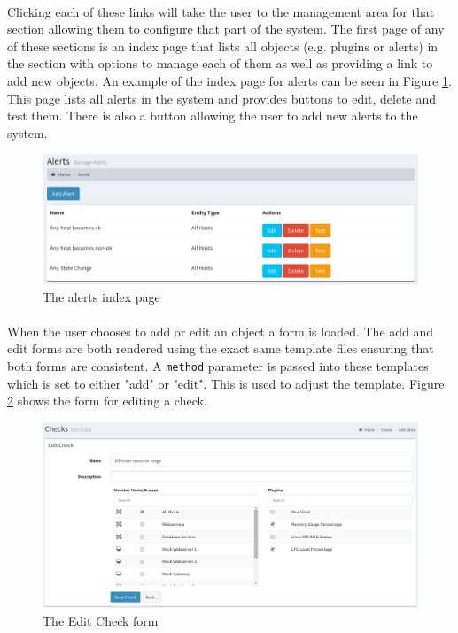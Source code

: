\documentclass[bsc,logo,twoside,singlespacing,notimes]{infthesis}
\begin{document}
\paragraph*{}
	Clicking each of these links will take the user to the management area for
	that section allowing them to configure that part of the system.  The first
	page of any of these sections is an index page that lists all objects (e.g.
	plugins or alerts) in the section with options to manage each of them as well
	as providing a link to add new objects.  An example of the index page for
	alerts can be seen in Figure \ref{alerts-index}.  This page lists all alerts
	in the system and provides buttons to edit, delete and test them. There is
	also a button allowing the user to add new alerts to the system.
	
\begin{figure}[H]
	\caption{The alerts index page}
	\label{alerts-index}
	\includegraphics[scale=0.55]{assets/screenshots/alerts-index.pdf}
\end{figure}
	
\paragraph*{}
	When the user chooses to add or edit an object a form is loaded.  The add and
	edit forms are both rendered using the exact same template files ensuring that
	both forms are consistent.  A \texttt{method} parameter is passed into these
	templates which is set to either "add" or "edit".  This is used to adjust the
	template.  Figure \ref{edit-check} shows the form for editing a check.

\begin{figure}[H]
	\caption{The Edit Check form}
	\label{edit-check}
	\includegraphics[scale=0.45]{assets/screenshots/edit-check.pdf}
\end{figure}	
\end{document}
